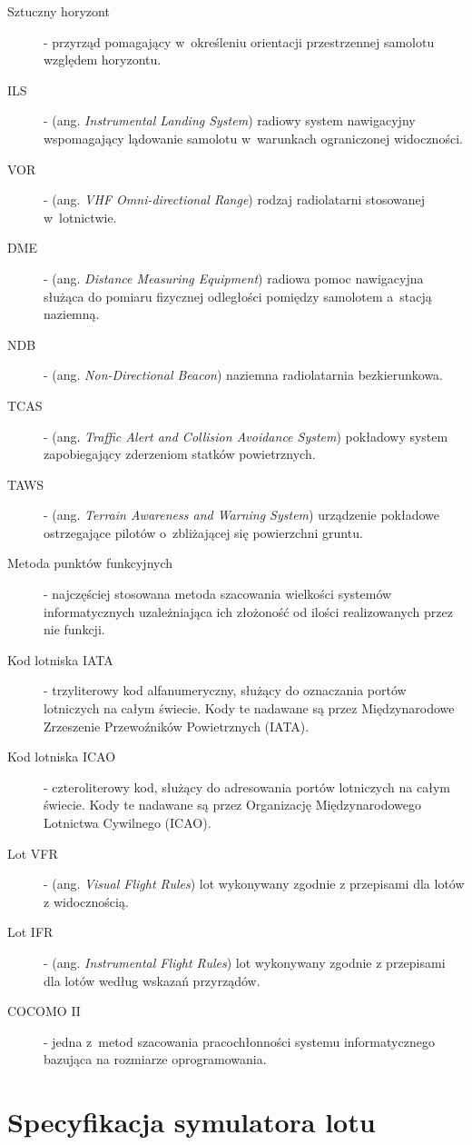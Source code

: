 \documentclass{mwrep}
\begin{document}
\begin{description}
\item[Sztuczny horyzont] - przyrząd pomagający w~określeniu orientacji przestrzennej samolotu względem horyzontu.
\item[ILS] - (ang. \emph{Instrumental Landing System}) radiowy system nawigacyjny wspomagający lądowanie samolotu w~warunkach ograniczonej widoczności.
\item[VOR] - (ang. \emph{VHF Omni-directional Range}) rodzaj radiolatarni stosowanej w~lotnictwie.
\item[DME] - (ang. \emph{Distance Measuring Equipment}) radiowa pomoc nawigacyjna służąca do pomiaru fizycznej odległości pomiędzy samolotem a~stacją naziemną.
\item[NDB] - (ang. \emph{Non-Directional Beacon}) naziemna radiolatarnia bezkierunkowa.
\item[TCAS] - (ang. \emph{Traffic Alert and Collision Avoidance System}) pokładowy system zapobiegający zderzeniom statków powietrznych.
\item[TAWS] - (ang. \emph{Terrain Awareness and Warning System}) urządzenie pokładowe ostrzegające pilotów o~zbliżającej się powierzchni gruntu.
\item[Metoda punktów funkcyjnych] - najczęściej stosowana metoda szacowania wielkości systemów informatycznych uzależniająca ich złożoność od ilości realizowanych przez nie funkcji.
\item[Kod lotniska IATA] - trzyliterowy kod alfanumeryczny, służący do oznaczania portów lotniczych na całym świecie. Kody te nadawane są przez Międzynarodowe Zrzeszenie Przewoźników Powietrznych (IATA).
\item[Kod lotniska ICAO] - czteroliterowy kod, służący do adresowania portów lotniczych na całym świecie. Kody te nadawane są przez Organizację Międzynarodowego Lotnictwa Cywilnego (ICAO).
\item[Lot VFR] - (ang. \emph{Visual Flight Rules}) lot wykonywany zgodnie z przepisami dla lotów z widocznością.
\item[Lot IFR] - (ang. \emph{Instrumental Flight Rules}) lot wykonywany zgodnie z przepisami dla lotów według wskazań przyrządów.
\item[COCOMO II] - jedna z~metod szacowania pracochłonności systemu informatycznego bazująca na rozmiarze oprogramowania.
\end{description}

\chapter{Specyfikacja symulatora lotu}
\end{document}
